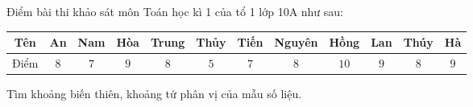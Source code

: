 \begin{ex}
Điểm bài thi khảo sát môn Toán học kì 1 của tổ 1 lớp 10A như sau:
\begin{center}
\begin{tabular}{|c|c|c|c|c|c|c|c|c|c|c|c|}\hline
Tên & An & Nam & Hòa & Trung & Thủy & Tiến & Nguyên & Hồng & Lan & Thúy & Hà\\\hline
Điểm & $8$ & $7$ & $9$ & $8$ & $5$ & $7$ & $8$ & $10$ & $9$ & $8$ & $9$\\\hline
\end{tabular}
\end{center}
Tìm khoảng biến thiên, khoảng tứ phân vị của mẫu số liệu.
\end{ex}
